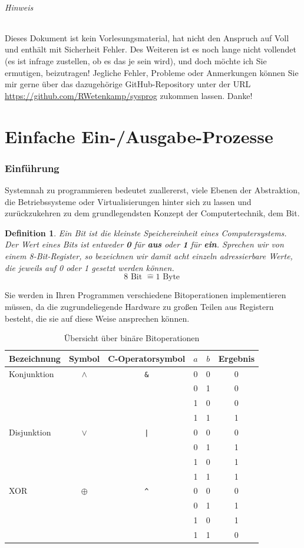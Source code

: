 \documentclass[11pt,a4paper]{scrartcl}
\newtheorem{definition}{Definition}
\begin{document}
\paragraph{Hinweis}
Dieses Dokument ist kein Vorlesungsmaterial, hat nicht den Anspruch auf {Voll} und enthält mit Sicherheit Fehler. Des Weiteren ist es noch lange nicht vollendet (es ist infrage zustellen, ob es das je sein wird), und doch möchte ich Sie ermutigen, beizutragen! Jegliche Fehler, Probleme oder Anmerkungen können Sie mir gerne über das dazugehörige GitHub-Repository unter der URL \url{https://github.com/RWetenkamp/sysprog} zukommen lassen. Danke!
\pagebreak
\part{Einfache Ein-/Ausgabe-Prozesse}
\section{Einführung}
Systemnah zu programmieren bedeutet zuallererst, viele Ebenen der Abstraktion, die Betriebssysteme oder Virtualisierungen hinter sich zu lassen und zurückzukehren zu dem grundlegendsten Konzept der Computertechnik, dem Bit. \\
\begin{definition}
Ein Bit ist die kleinste Speichereinheit eines Computersystems. Der Wert eines Bits ist entweder \textbf{0} für \textbf{aus} oder \textbf{1} für \textbf{ein}. Sprechen wir von einem 8-Bit-Register, so bezeichnen wir damit acht einzeln adressierbare Werte, die jeweils auf 0 oder 1 gesetzt werden können. 
\[8 \text{ Bit } \widehat{=} 1 \text{ Byte }\]
\end{definition}

Sie werden in Ihren Programmen verschiedene Bitoperationen implementieren müssen, da die zugrundeliegende Hardware zu großen Teilen aus Registern besteht, die sie auf diese Weise ansprechen können.
\begin{table}[h]
\centering
\begin{tabular}{|l|c|c|c|c|c|}
\hline
Bezeichnung & Symbol & C-Operatorsymbol & $a$ & $b$ & Ergebnis \\
\hline
Konjunktion & $\land$ & \texttt{\&} & 0 & 0 & 0 \\
&&&0 & 1 & 0 \\
&&&1 & 0 & 0 \\
&&&1 & 1 & 1 \\
\hline
Disjunktion & $\lor$ & \texttt{|} & 0 & 0 & 0 \\
&&&0 & 1 & 1 \\
&&&1 & 0 & 1 \\
&&&1 & 1 & 1 \\
\hline
XOR & $\oplus$ & \texttt{\^} & 0 & 0 & 0 \\
&&&0 & 1 & 1 \\
&&&1 & 0 & 1 \\
&&&1 & 1 & 0 \\
\hline
\end{tabular}
\caption{Übersicht über binäre Bitoperationen}
\end{table} \\
\end{document}
